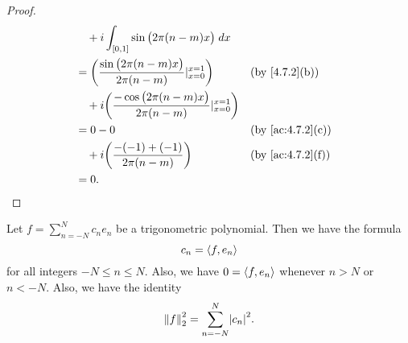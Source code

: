\begin{proof}
\begin{align*}
     & \quad + i \int_{[0, 1]} \sin\big(2 \pi (n - m) x\big) \; dx                                                                      \\
     & = \bigg(\dfrac{\sin\big(2 \pi (n - m) x\big)}{2 \pi (n - m)}|_{x = 0}^{x = 1}\bigg)          &  & \text{(by \cref{4.7.2}(b))}    \\
     & \quad + i \bigg(\dfrac{-\cos\big(2 \pi (n - m) x\big)}{2 \pi (n - m)}|_{x = 0}^{x = 1}\bigg)                                     \\
     & = 0 - 0                                                                                      &  & \text{(by \cref{ac:4.7.2}(c))} \\
     & \quad + i \bigg(\dfrac{- (-1) + (-1)}{2 \pi (n - m)}\bigg)                                   &  & \text{(by \cref{ac:4.7.2}(f))} \\
     & = 0.
  \end{align*}
\end{proof}

\begin{cor}\label{5.3.6}
  Let \(f = \sum_{n = -N}^N c_n e_n\) be a trigonometric polynomial.
  Then we have the formula
  \[
    c_n = \inner*{f, e_n}
  \]
  for all integers \(-N \leq n \leq N\).
  Also, we have \(0 = \inner*{f, e_n}\) whenever \(n > N\) or \(n < -N\).
  Also, we have the identity
  \[
    \norm*{f}_2^2 = \sum_{n = -N}^N \abs{c_n}^2.
  \]
\end{cor}

